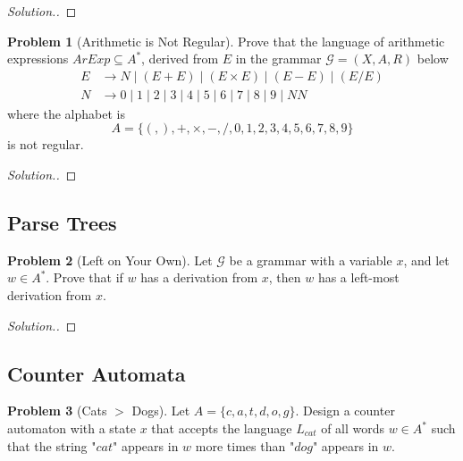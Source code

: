 \documentclass[11pt]{article}
\theoremstyle{theorem} %
\theoremstyle{definition} %
\newtheorem{problem}                    {{\color{BurntOrange}Problem}}
\theoremstyle{remark} %
\begin{document}
\begin{proof}
    [Solution.]
\end{proof}

\begin{problem}
    [Arithmetic is Not Regular]
    Prove that the language of arithmetic expressions \(\mathit{ArExp} \subseteq A^*\), derived from \(E\) in the grammar \(\mathcal G = (X, A, R)\) below
    \[\begin{aligned}
        E &\to 
            N
            \mid (E + E)
            \mid (E \times E)
            \mid (E - E)
            \mid (E / E) \\
        N &\to 0 \mid 1 \mid 2 \mid 3 \mid 4 \mid 5 \mid 6 \mid 7 \mid 8 \mid 9 \mid NN
    \end{aligned}\]
    where the alphabet is
    \[
        A = \big\{ (, ), +, \times, -, /, 0,1,2,3,4,5,6,7,8,9 \big\}
    \]
    is not regular. 
\end{problem}

\begin{proof}
    [Solution.]
\end{proof}

\subsection*{Parse Trees}

\begin{problem}
    [Left on Your Own]
    Let \(\mathcal G\) be a grammar with a variable \(x\), and let \(w \in A^*\).
    Prove that if \(w\) has a derivation from \(x\), then \(w\) has a left-most derivation from \(x\).
\end{problem}

\begin{proof}
    [Solution.]
\end{proof}

\subsection*{Counter Automata}

\begin{problem}
    [Cats \(>\) Dogs]
    Let \(A = \{c, a, t, d, o, g\}\). 
    Design a counter automaton with a state \(x\) that accepts the language \(L_{cat}\) of all words \(w \in A^*\) such that the string "\(cat\)" appears in \(w\) more times than "\(dog\)" appears in \(w\).
\end{problem}
\end{document}
